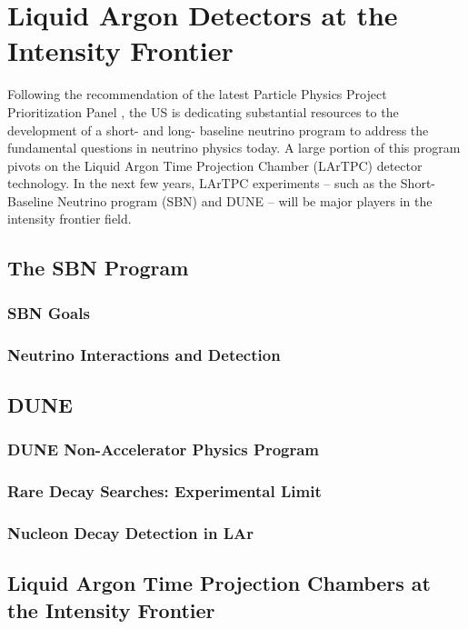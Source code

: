 \chapter{Liquid Argon Detectors at the Intensity Frontier}\label{ch:1}
Following the recommendation of the latest Particle Physics Project Prioritization Panel  \cite{ParticlePhysicsProjectPrioritizationPanel(P5):2014pwa}, the US is dedicating substantial resources to the development of a short- and long- baseline neutrino program to address the fundamental questions in neutrino physics today. A large portion of this program pivots on the Liquid Argon Time Projection Chamber (LArTPC) detector technology. In the next few years, LArTPC experiments -- such as the Short-Baseline Neutrino program (SBN) and DUNE -- will be major players in the intensity frontier field. 

\section{The SBN Program}
\subsection{SBN Goals}
\subsection{Neutrino Interactions and Detection }

\section{DUNE}
\subsection{DUNE Non-Accelerator Physics Program}
\subsection{Rare Decay Searches: Experimental Limit}
\subsection{Nucleon Decay Detection in LAr}

\section{Liquid Argon Time Projection Chambers at the Intensity Frontier}

